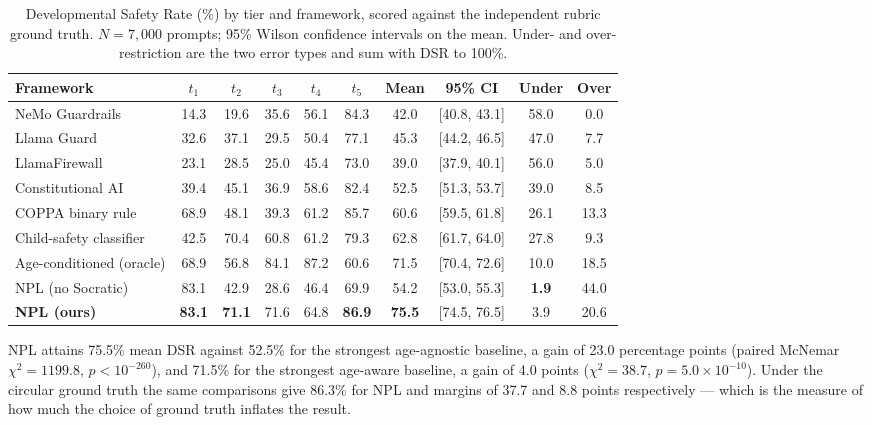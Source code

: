 \documentclass[fleqn,10pt]{wlscirep}
\begin{document}
\begin{table}[H]
\centering
\caption{Developmental Safety Rate (\%) by tier and framework, scored against the independent rubric ground truth. $N = 7{,}000$ prompts; 95\% Wilson confidence intervals on the mean. Under- and over-restriction are the two error types and sum with DSR to 100\%.}
\label{tab:dsr_full}
\small
\begin{tabular}{lccccccccc}
\hline
\textbf{Framework} & $t_1$ & $t_2$ & $t_3$ & $t_4$ & $t_5$ & \textbf{Mean} & \textbf{95\% CI} & \textbf{Under} & \textbf{Over} \\
\hline
NeMo Guardrails          & 14.3 & 19.6 & 35.6 & 56.1 & 84.3 & 42.0 & [40.8, 43.1] & 58.0 & 0.0 \\
Llama Guard              & 32.6 & 37.1 & 29.5 & 50.4 & 77.1 & 45.3 & [44.2, 46.5] & 47.0 & 7.7 \\
LlamaFirewall            & 23.1 & 28.5 & 25.0 & 45.4 & 73.0 & 39.0 & [37.9, 40.1] & 56.0 & 5.0 \\
Constitutional AI        & 39.4 & 45.1 & 36.9 & 58.6 & 82.4 & 52.5 & [51.3, 53.7] & 39.0 & 8.5 \\
COPPA binary rule        & 68.9 & 48.1 & 39.3 & 61.2 & 85.7 & 60.6 & [59.5, 61.8] & 26.1 & 13.3 \\
Child-safety classifier  & 42.5 & 70.4 & 60.8 & 61.2 & 79.3 & 62.8 & [61.7, 64.0] & 27.8 & 9.3 \\
Age-conditioned (oracle) & 68.9 & 56.8 & 84.1 & 87.2 & 60.6 & 71.5 & [70.4, 72.6] & 10.0 & 18.5 \\
NPL (no Socratic)        & 83.1 & 42.9 & 28.6 & 46.4 & 69.9 & 54.2 & [53.0, 55.3] & \textbf{1.9} & 44.0 \\
\textbf{NPL (ours)}      & \textbf{83.1} & \textbf{71.1} & 71.6 & 64.8 & \textbf{86.9} & \textbf{75.5} & [74.5, 76.5] & 3.9 & 20.6 \\
\hline
\end{tabular}
\end{table}

NPL attains 75.5\% mean DSR against 52.5\% for the strongest age-agnostic baseline, a gain of 23.0 percentage points (paired McNemar $\chi^2 = 1199.8$, $p < 10^{-260}$), and 71.5\% for the strongest age-aware baseline, a gain of 4.0 points ($\chi^2 = 38.7$, $p = 5.0 \times 10^{-10}$). Under the circular ground truth the same comparisons give 86.3\% for NPL and margins of 37.7 and 8.8 points respectively --- which is the measure of how much the choice of ground truth inflates the result.
\end{document}
